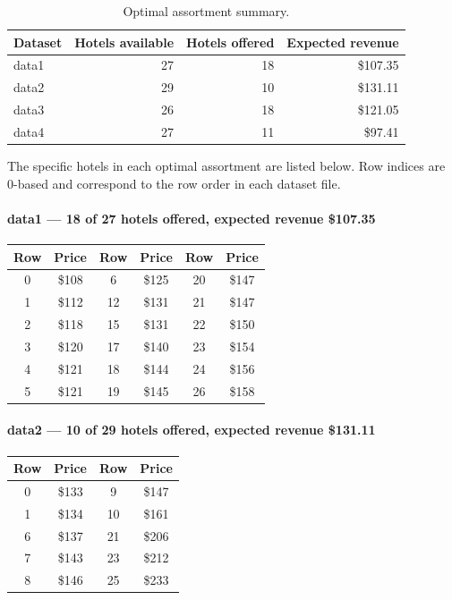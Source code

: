 \documentclass[11pt]{article}
\begin{document}
\begin{table}[h]
\centering
\begin{tabular}{lrrr}
\toprule
Dataset & Hotels available & Hotels offered & Expected revenue \\
\midrule
data1 & 27 & 18 & \$107.35 \\
data2 & 29 & 10 & \$131.11 \\
data3 & 26 & 18 & \$121.05 \\
data4 & 27 & 11 & \$97.41  \\
\bottomrule
\end{tabular}
\caption{Optimal assortment summary.}
\end{table}

The specific hotels in each optimal assortment are listed below. Row indices are 0-based and correspond to the row order in each dataset file.

\paragraph{data1 \textnormal{--- 18 of 27 hotels offered, expected revenue \$107.35}}
\begin{center}\small
\begin{tabular}{cc|cc|cc}
\toprule
Row & Price & Row & Price & Row & Price \\
\midrule
 0 & \$108 &  6 & \$125 & 20 & \$147 \\
 1 & \$112 & 12 & \$131 & 21 & \$147 \\
 2 & \$118 & 15 & \$131 & 22 & \$150 \\
 3 & \$120 & 17 & \$140 & 23 & \$154 \\
 4 & \$121 & 18 & \$144 & 24 & \$156 \\
 5 & \$121 & 19 & \$145 & 26 & \$158 \\
\bottomrule
\end{tabular}
\end{center}

\paragraph{data2 \textnormal{--- 10 of 29 hotels offered, expected revenue \$131.11}}
\begin{center}\small
\begin{tabular}{cc|cc}
\toprule
Row & Price & Row & Price \\
\midrule
 0 & \$133 &  9 & \$147 \\
 1 & \$134 & 10 & \$161 \\
 6 & \$137 & 21 & \$206 \\
 7 & \$143 & 23 & \$212 \\
 8 & \$146 & 25 & \$233 \\
\bottomrule
\end{tabular}
\end{center}
\end{document}
